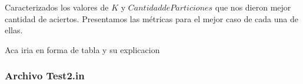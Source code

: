 Caracterizados los valores de $K$ y $Cantidad de Particiones$ que nos dieron mejor cantidad de aciertos. Presentamos las métricas para el mejor caso de cada una de ellas.

Aca iria en forma de tabla y su explicacion





\subsubsection {Archivo Test2.in}





